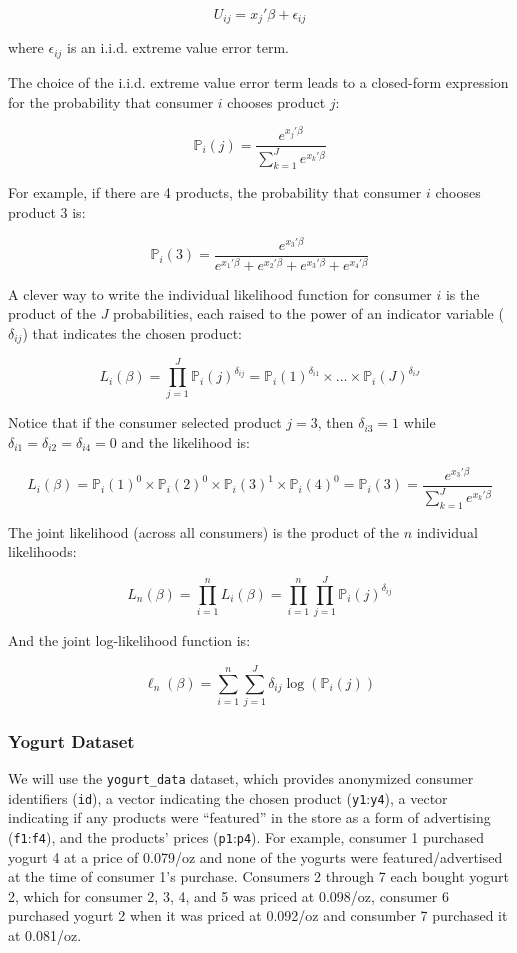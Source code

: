 \documentclass[
  letterpaper,
  DIV=11,
  numbers=noendperiod]{scrartcl}
\begin{document}
\[ U_{ij} = x_j'\beta + \epsilon_{ij} \]

where \(\epsilon_{ij}\) is an i.i.d. extreme value error term.

The choice of the i.i.d. extreme value error term leads to a closed-form
expression for the probability that consumer \(i\) chooses product
\(j\):

\[ \mathbb{P}_i(j) = \frac{e^{x_j'\beta}}{\sum_{k=1}^Je^{x_k'\beta}} \]

For example, if there are 4 products, the probability that consumer
\(i\) chooses product 3 is:

\[ \mathbb{P}_i(3) = \frac{e^{x_3'\beta}}{e^{x_1'\beta} + e^{x_2'\beta} + e^{x_3'\beta} + e^{x_4'\beta}} \]

A clever way to write the individual likelihood function for consumer
\(i\) is the product of the \(J\) probabilities, each raised to the
power of an indicator variable (\(\delta_{ij}\)) that indicates the
chosen product:

\[ L_i(\beta) = \prod_{j=1}^J \mathbb{P}_i(j)^{\delta_{ij}} = \mathbb{P}_i(1)^{\delta_{i1}} \times \ldots \times \mathbb{P}_i(J)^{\delta_{iJ}}\]

Notice that if the consumer selected product \(j=3\), then
\(\delta_{i3}=1\) while \(\delta_{i1}=\delta_{i2}=\delta_{i4}=0\) and
the likelihood is:

\[ L_i(\beta) = \mathbb{P}_i(1)^0 \times \mathbb{P}_i(2)^0 \times \mathbb{P}_i(3)^1 \times \mathbb{P}_i(4)^0 = \mathbb{P}_i(3) = \frac{e^{x_3'\beta}}{\sum_{k=1}^Je^{x_k'\beta}} \]

The joint likelihood (across all consumers) is the product of the \(n\)
individual likelihoods:

\[ L_n(\beta) = \prod_{i=1}^n L_i(\beta) = \prod_{i=1}^n \prod_{j=1}^J \mathbb{P}_i(j)^{\delta_{ij}} \]

And the joint log-likelihood function is:

\[ \ell_n(\beta) = \sum_{i=1}^n \sum_{j=1}^J \delta_{ij} \log(\mathbb{P}_i(j)) \]

\subsubsection{Yogurt Dataset}\label{yogurt-dataset}

We will use the \texttt{yogurt\_data} dataset, which provides anonymized
consumer identifiers (\texttt{id}), a vector indicating the chosen
product (\texttt{y1}:\texttt{y4}), a vector indicating if any products
were ``featured'' in the store as a form of advertising
(\texttt{f1}:\texttt{f4}), and the products' prices
(\texttt{p1}:\texttt{p4}). For example, consumer 1 purchased yogurt 4 at
a price of 0.079/oz and none of the yogurts were featured/advertised at
the time of consumer 1's purchase. Consumers 2 through 7 each bought
yogurt 2, which for consumer 2, 3, 4, and 5 was priced at 0.098/oz,
consumer 6 purchased yogurt 2 when it was priced at 0.092/oz and
consumber 7 purchased it at 0.081/oz.
\end{document}
